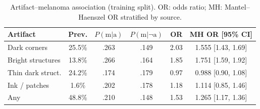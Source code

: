 \documentclass[conference]{IEEEtran}
\begin{document}
\begin{table}[t]
\caption{Artifact--melanoma association (training split). OR: odds ratio; MH: Mantel--Haenszel OR stratified by source.}
\label{tab:bias}
\centering
\scriptsize
\setlength{\tabcolsep}{2.2pt}
\begin{tabular}{lccccc}
\toprule
Artifact & Prev. & $P(\mathrm{m}|\mathrm{a})$ & $P(\mathrm{m}|\neg\mathrm{a})$ & OR & MH OR [95\% CI] \\
\midrule
Dark corners & 25.5\% & .263 & .149 & 2.03 & 1.555 [1.43, 1.69] \\
Bright structures & 13.8\% & .266 & .164 & 1.85 & 1.751 [1.59, 1.92] \\
Thin dark struct. & 24.2\% & .174 & .179 & 0.97 & 0.988 [0.90, 1.08] \\
Ink / patches & 1.6\% & .202 & .178 & 1.18 & 1.114 [0.85, 1.46] \\
Any & 48.8\% & .210 & .148 & 1.53 & 1.265 [1.17, 1.36] \\
\bottomrule
\end{tabular}
\end{table}
\end{document}
